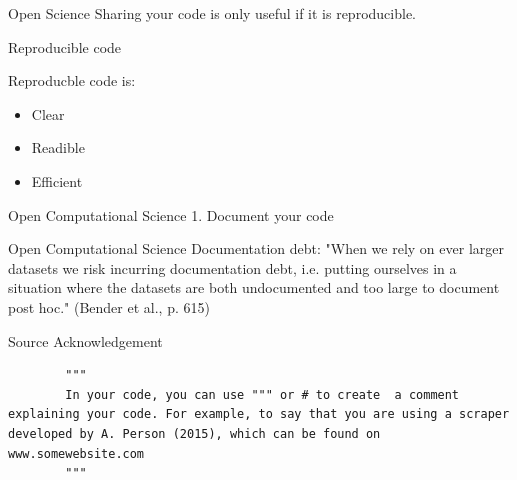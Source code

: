 \documentclass[compress]{beamer}
\begin{document}
\begin{frame}[fragile]{Open Science} 	
	Sharing your code is only useful if it is reproducible.
\end{frame}

\begin{frame}{Reproducible code}
	\begin{alertblock}{Reproducble code is:}
		\begin{itemize}
			\item Clear
			\item Readible
			\item Efficient
		\end{itemize}
	\end{alertblock}
\end{frame}




\begin{frame}{Open Computational Science}
	1. Document your code
\end{frame}

\begin{frame}{Open Computational Science}
	Documentation debt: "When we rely on ever larger datasets we risk incurring documentation debt, i.e. putting ourselves in a situation where the datasets are both undocumented and too large to document post hoc." (Bender et al., p. 615)
	
\end{frame}

\begin{frame}[fragile]{Source Acknowledgement}
	
	\begin{lstlisting}		
		"""
		In your code, you can use """ or # to create  a comment explaining your code. For example, to say that you are using a scraper developed by A. Person (2015), which can be found on www.somewebsite.com
		"""
	\end{lstlisting}
\end{frame}
\end{document}
